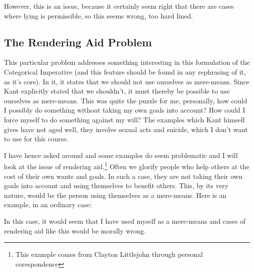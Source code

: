 However, this is an issue, because it certainly seem right that there are cases where lying is permissible, so this seems wrong, too hard lined. 

\subsection{The Rendering Aid Problem}

This particular problem addresses something interesting in this formulation of the Categorical Imperative (and this feature should be found in any rephrasing of it, as it's core). In it, it states that we should not use ourselves as mere-means. Since Kant explicitly stated that we shouldn't, it must thereby be possible to use ourselves as mere-means. This was quite the puzzle for me, personally, how could I possibly do something without taking my own goals into account? How could I force myself to do something against my will? The examples which Kant himself gives have not aged well, they involve sexual acts and suicide, which I don't want to use for this course. 

I have hence asked around and some examples do seem problematic and I will look at the issue of rendering aid.\footnote{This example comes from Clayton Littlejohn through personal corespondence} Often we glorify people who help others at the cost of their own wants and goals. In such a case, they are not taking their own goals into account and using themselves to benefit others. This, by its very nature, would be the person using themselves as a mere-means. Here is an example, in an ordinary case:



In this case, it would seem that I have used myself as a mere-means and cases of rendering aid like this would be morally wrong.
